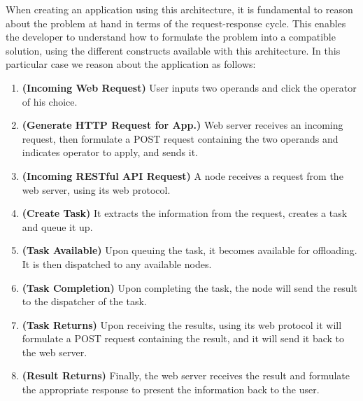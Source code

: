 \documentclass[12pt, titlepage]{uo_temp}
\begin{document}
     When creating an application using this architecture, it is fundamental to reason
     about the problem at hand in terms of the request-response cycle. This enables the
     developer to understand how to formulate the problem into a compatible solution,
     using the different constructs available with this architecture. In this particular
     case we reason about the application as follows:
     \begin{enumerate}
       \item \textbf{(Incoming Web Request)} User inputs two operands and click the operator of his choice.
       \item \textbf{(Generate HTTP Request for App.)} Web server receives an incoming
         request, then formulate a POST request containing the two operands and indicates
         operator to apply, and sends it.  
       \item \textbf{(Incoming RESTful API Request)} A node receives a request from the
         web server, using its web protocol.
       \item \textbf{(Create Task)} It extracts the information from the request, creates
         a task and queue it up.
       \item \textbf{(Task Available)} Upon queuing the task, it becomes available for
         offloading. It is then dispatched to any available nodes.
       \item \textbf{(Task Completion)} Upon completing the task, the node will send the
         result to the dispatcher of the task.
       \item \textbf{(Task Returns)} Upon receiving the results, using its web protocol it
         will formulate a POST request containing the result, and it will send it back to
         the web server.
       \item \textbf{(Result Returns)} Finally, the web server receives the result and
         formulate the appropriate response to present the information back to the user. 
     \end{enumerate}
     
\end{document}
